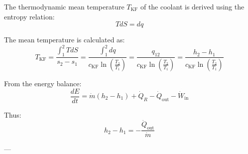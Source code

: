 The thermodynamic mean temperature \( T_{\text{KF}} \) of the coolant is derived using the entropy relation:  
\[
T dS = dq
\]  

The mean temperature is calculated as:  
\[
T_{\text{KF}} = \frac{\int_{1}^{2} T dS}{s_2 - s_1} = \frac{\int_{1}^{2} dq}{c_{\text{KF}} \ln\left(\frac{T_2}{T_1}\right)} = \frac{q_{12}}{c_{\text{KF}} \ln\left(\frac{T_2}{T_1}\right)} = \frac{h_2 - h_1}{c_{\text{KF}} \ln\left(\frac{T_2}{T_1}\right)}
\]  

From the energy balance:  
\[
\frac{dE}{dt} = \dot{m} (h_2 - h_1) + \dot{Q}_R - \dot{Q}_{\text{out}} - \dot{W}_{\text{in}}
\]  

Thus:  
\[
h_2 - h_1 = -\frac{\dot{Q}_{\text{out}}}{\dot{m}}
\]  

---